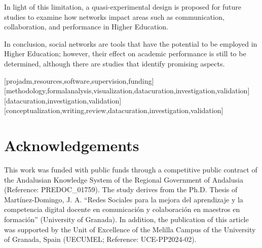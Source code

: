 \documentclass[english]{textolivre}
\begin{document}
In light of this limitation, a quasi-experimental design is proposed for future studies to examine how networks impact areas such as communication, collaboration, and performance in Higher Education.

In conclusion, social networks are tools that have the potential to be employed in Higher Education; however, their effect on academic performance is still to be determined, although there are studies that identify promising aspects.



\printbibliography\label{sec-bib}


\begin{contributors}
[projadm,resources,software,supervision,funding]
[methodology,formalanalysis,visualization,datacuration,investigation,validation]
[datacuration,investigation,validation]
[conceptualization,writing,review,datacuration,investigation,validation]
\end{contributors}

\section*{Acknowledgements}
This work was funded with public funds through a competitive public contract of the Andalusian Knowledge System of the Regional Government of Andalusia (Reference: PREDOC\_01759). The study derives from the Ph.D. Thesis of Martínez-Domingo, J. A. ``Redes Sociales para la mejora del aprendizaje y la competencia digital docente en comunicación y colaboración en maestros en formación'' (University of Granada). In addition, the publication of this article was supported by the Unit of Excellence of the Melilla Campus of the University of Granada, Spain (UECUMEL; Reference: UCE-PP2024-02).

\begin{dataavailability}
\end{dataavailability}
\end{document}
